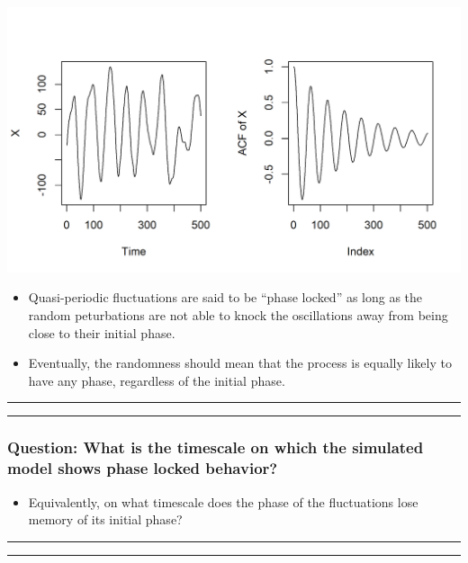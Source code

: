 \documentclass[]{article}
\providecommand{\tightlist}{%
  \setlength{\itemsep}{0pt}\setlength{\parskip}{0pt}}
\begin{document}
\begin{center}\includegraphics{figure/intro-quasi_periodic-1} \end{center}
\begin{itemize}
\item
  Quasi-periodic fluctuations are said to be ``phase locked'' as long as
  the random peturbations are not able to knock the oscillations away
  from being close to their initial phase.
\item
  Eventually, the randomness should mean that the process is equally
  likely to have any phase, regardless of the initial phase.
\end{itemize}

\begin{center}\rule{0.5\linewidth}{\linethickness}\end{center}

\begin{center}\rule{0.5\linewidth}{\linethickness}\end{center}

\subsubsection{Question: What is the timescale on which the simulated
model shows phase locked
behavior?}\label{question-what-is-the-timescale-on-which-the-simulated-model-shows-phase-locked-behavior}

\begin{itemize}
\tightlist
\item
  Equivalently, on what timescale does the phase of the fluctuations
  lose memory of its initial phase?
\end{itemize}

\begin{center}\rule{0.5\linewidth}{\linethickness}\end{center}

\begin{center}\rule{0.5\linewidth}{\linethickness}\end{center}
\end{document}
